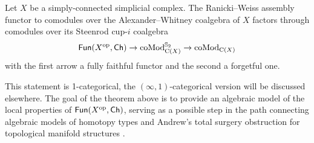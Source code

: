 \begin{theorem*}
	Let $X$ be a simply-connected simplicial complex.
	The Ranicki--Weiss assembly functor to comodules over the Alexander--Whitney coalgebra of $X$ factors through comodules over its Steenrod cup-$i$ coalgebra
	\[
	\mathsf{Fun}(X^{\mathrm{op}}, \mathsf{Ch}) \to \operatorname{coMod}^{\mathbb{S}_2}_{\operatorname{C}(X)} \to \operatorname{coMod}_{\operatorname{C}(X)}
	\]
	with the first arrow a fully faithful functor and the second a forgetful one.
\end{theorem*}

This statement is 1-categorical, the $(\infty,1)$-categorical version will be discussed elsewhere.
The goal of the theorem above is to provide an algebraic model of the local properties of $\mathsf{Fun}(X^{\mathrm{op}},\mathsf{Ch})$, serving as a possible step in the path connecting algebraic models of homotopy types \cite{quillen1969rational, sullivan1977infinitesimal,mandell2001padic} and Andrew's total surgery obstruction for topological manifold structures \cite{ranicki1979obstruction,ranicki1992topological,macko2013obstruction}.